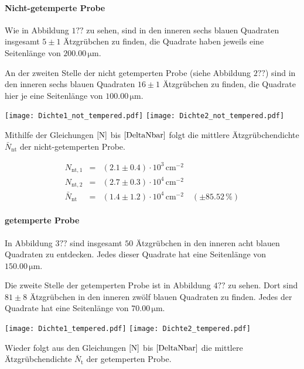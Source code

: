 \documentclass[12pt,a4paper]{scrartcl}
\numberwithin{equation}{section} %
\renewcommand{\[}{} %
\renewcommand{\]}{\noindent} %
\begin{document}
\hypertarget{nicht-getemperte-probe}{%
\paragraph{Nicht-getemperte Probe}\label{nicht-getemperte-probe}}

Wie in Abbildung \(1??\) zu sehen, sind in den inneren sechs blauen
Quadraten insgesamt \(5\pm1\) Ätzgrübchen zu finden, die Quadrate haben
jeweils eine Seitenlänge von \(200.00 \mathrm{\,\mu m}\).

An der zweiten Stelle der nicht getemperten Probe (siehe Abbildung
\(2??\)) sind in den inneren sechs blauen Quadraten \(16\pm1\)
Ätzgrübchen zu finden, die Quadrate hier je eine Seitenlänge von
\(100.00 \mathrm{\, \mu m}\).

\texttt{[image: Dichte1\_not\_tempered.pdf]}
\texttt{[image: Dichte2\_not\_tempered.pdf]}

Mithilfe der Gleichungen \(\eqref{N}\) bis \(\eqref{DeltaNbar}\) folgt
die mittlere Ätzgrübchendichte \(\bar N_\mathrm{nt}\) der
nicht-getemperten Probe.

\[
\begin{eqnarray}
    N_\mathrm{nt,1} &=& (2.1 \pm 0.4) \cdot 10^3 \mathrm{\, cm^{-2}} \\
    N_\mathrm{nt,2} &=& (2.7 \pm 0.3) \cdot 10^{4} \mathrm{\, cm^{-2}} \\
    \bar N_\mathrm{nt}
        &=& (1.4 \pm 1.2) \cdot 10^4 \mathrm{\, cm^{-2}}
        \quad(\pm 85.52\,\%)
\end{eqnarray}
\]

\hypertarget{getemperte-probe}{%
\paragraph{getemperte Probe}\label{getemperte-probe}}

In Abbildung \(3??\) sind insgesamt \(50\) Ätzgrübchen in den inneren
acht blauen Quadraten zu entdecken. Jedes dieser Quadrate hat eine
Seitenlänge von \(150.00 \mathrm{\, \mu m}\).

Die zweite Stelle der getemperten Probe ist in Abbildung \(4??\) zu
sehen. Dort sind \(81\pm8\) Ätzgrübchen in den inneren zwölf blauen
Quadraten zu finden. Jedes der Quadrate hat eine Seitenlänge von
\(70.00 \mathrm{\, \mu m}\).

\texttt{[image: Dichte1\_tempered.pdf]}
\texttt{[image: Dichte2\_tempered.pdf]}

Wieder folgt aus den Gleichungen \(\eqref{N}\) bis \(\eqref{DeltaNbar}\)
die mittlere Ätzgrübchendichte \(\bar N_\mathrm{t}\) der getemperten
Probe.
\end{document}
